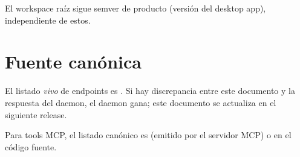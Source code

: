 El workspace raíz sigue semver de producto (versión del desktop
app), independiente de estos.

\section{Fuente canónica}

El listado \emph{vivo} de endpoints es . Si hay
discrepancia entre este documento y la respuesta del daemon, el
daemon gana; este documento se actualiza en el siguiente release.

Para tools MCP, el listado canónico es
 (emitido por el servidor MCP) o
 en el código fuente.
